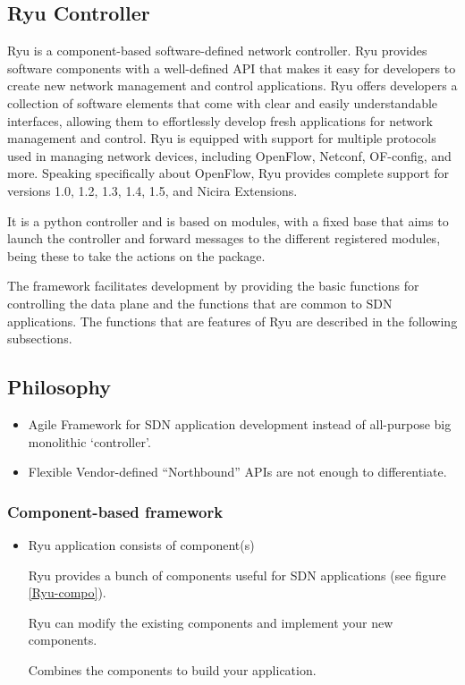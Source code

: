 \documentclass[
  oneside,
  11pt, a4paper,
  footinclude=true,
  headinclude=true,
  cleardoublepage=empty
]{scrbook}
\begin{document}
\subsection{Ryu Controller}
\label{Ryu-Controller}

Ryu is a component-based software-defined network controller. Ryu provides software components with a well-defined API that makes it easy for developers to create new network management and control applications.
Ryu offers developers a collection of software elements that come with clear and easily understandable interfaces, allowing them to effortlessly develop fresh applications for network management and control. Ryu is equipped with support for multiple protocols used in managing network devices, including OpenFlow, Netconf, OF-config, and more. Speaking specifically about OpenFlow, Ryu provides complete support for versions 1.0, 1.2, 1.3, 1.4, 1.5, and Nicira Extensions.

It is a python controller and is based on modules, with a fixed base that aims to launch the controller and forward messages to the different registered modules, being these to take the actions on the package.\par
The framework facilitates development by providing the basic functions for controlling the data plane and the functions that are common to SDN applications. The functions that are features of Ryu are described in the following subsections.\par


\subsection{Philosophy}

\begin{itemize}
    \item  Agile
    Framework for SDN application development instead of all-purpose big monolithic ‘controller’.
    \item Flexible
    Vendor-defined “Northbound” APIs are not enough to differentiate.
\end{itemize}

\subsubsection{Component-based framework}

\begin{itemize}
    \item Ryu application consists of component(s)\par
        Ryu provides a bunch of components useful for SDN
applications (see figure \ref{Ryu-compo}).\par
        Ryu can modify the existing components and implement your new components. \par
        Combines the components to build your application.\par
\end{itemize}
\end{document}
